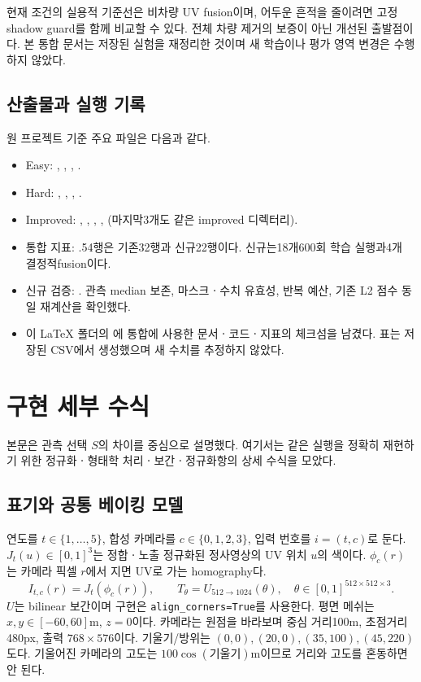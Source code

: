 \documentclass[11pt,a4paper]{article}
\begin{document}
현재 조건의 실용적 기준선은 비차량 UV fusion이며, 어두운 흔적을 줄이려면 고정 shadow guard를 함께 비교할 수 있다. 전체 차량 제거의 보증이 아닌 개선된 출발점이다. 본 통합 문서는 저장된 실험을 재정리한 것이며 새 학습이나 평가 영역 변경은 수행하지 않았다.

\subsection{산출물과 실행 기록}
원 프로젝트 기준 주요 파일은 다음과 같다.
\begin{itemize}
\item Easy: , , , .
\item Hard: , , , .
\item Improved: , , , ,  (마지막3개도 같은 improved 디렉터리).
\item 통합 지표: .54행은 기존32행과 신규22행이다. 신규는18개600회 학습 실행과4개 결정적fusion이다.
\item 신규 검증: . 관측 median 보존, 마스크ㆍ수치 유효성, 반복 예산, 기존 L2 점수 동일 재계산을 확인했다.
\item 이 LaTeX 폴더의 에 통합에 사용한 문서ㆍ코드ㆍ지표의 체크섬을 남겼다. 표는 저장된 CSV에서 생성했으며 새 수치를 추정하지 않았다.
\end{itemize}

\clearpage
\appendix
\section{구현 세부 수식}
본문은 관측 선택 $S$의 차이를 중심으로 설명했다. 여기서는 같은 실행을 정확히 재현하기 위한 정규화ㆍ형태학 처리ㆍ보간ㆍ정규화항의 상세 수식을 모았다.\par
\subsection{표기와 공통 베이킹 모델}
연도를 $t\in\{1,\ldots,5\}$, 합성 카메라를 $c\in\{0,1,2,3\}$, 입력 번호를 $i=(t,c)$로 둔다. $J_t(u)\in[0,1]^3$는 정합ㆍ노출 정규화된 정사영상의 UV 위치 $u$의 색이다. $\phi_c(r)$는 카메라 픽셀 $r$에서 지면 UV로 가는 homography다.
\begin{equation}
 I_{t,c}(r)=J_t(\phi_c(r)),\qquad T_\theta=U_{512\to1024}(\theta),\quad
 \theta\in[0,1]^{512\times512\times3}.
\end{equation}
$U$는 bilinear 보간이며 구현은 \texttt{align\_corners=True}를 사용한다. 평면 메쉬는 $x,y\in[-60,60]$m, $z=0$이다. 카메라는 원점을 바라보며 중심 거리100m, 초점거리480px, 출력 $768\times576$이다. 기울기/방위는 $(0,0),(20,0),(35,100),(45,220)$도다. 기울어진 카메라의 고도는 $100\cos(\text{기울기})$m이므로 거리와 고도를 혼동하면 안 된다.
\end{document}

